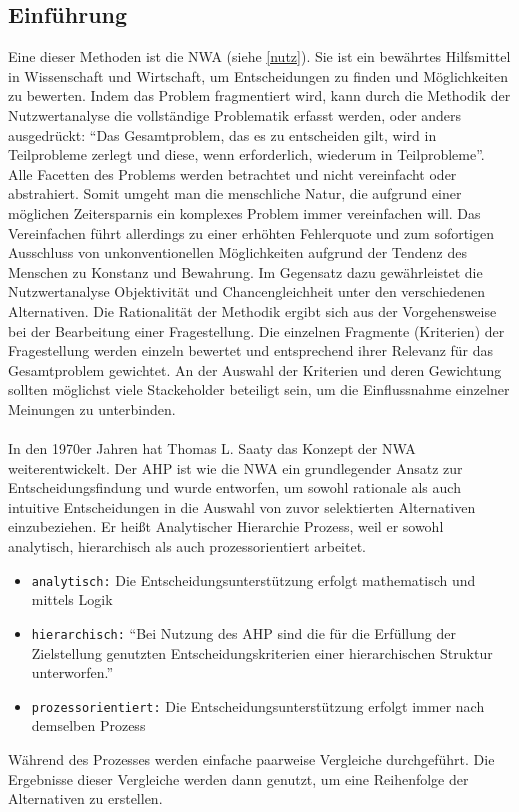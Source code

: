 \subsection{Einführung}
Eine dieser Methoden ist die \ac{NWA} (siehe \ref{nutz}). Sie ist ein bewährtes Hilfsmittel in Wissenschaft und Wirtschaft, um Entscheidungen zu finden und Möglichkeiten zu bewerten. Indem das Problem fragmentiert wird, kann durch die Methodik der Nutzwertanalyse die vollständige Problematik erfasst werden, oder anders ausgedrückt: \enquote{Das Gesamtproblem, das es zu entscheiden gilt, wird in Teilprobleme zerlegt und diese, wenn erforderlich, wiederum in Teilprobleme}\autocite[S.1]{Kuehnapfel.2014}. Alle Facetten des Problems werden betrachtet und nicht vereinfacht oder abstrahiert. Somit umgeht man die menschliche Natur, die aufgrund einer möglichen Zeitersparnis ein komplexes Problem immer vereinfachen will. Das Vereinfachen führt allerdings zu einer erhöhten Fehlerquote und zum sofortigen Ausschluss von unkonventionellen Möglichkeiten aufgrund der Tendenz des Menschen zu Konstanz und Bewahrung\autocite[Vgl.][S.1]{Kuehnapfel.2014}. Im Gegensatz dazu gewährleistet die Nutzwertanalyse Objektivität und Chancengleichheit unter den verschiedenen Alternativen.\newline
Die Rationalität der Methodik ergibt sich aus der Vorgehensweise bei der Bearbeitung einer Fragestellung. Die einzelnen Fragmente (Kriterien) der Fragestellung werden einzeln bewertet und entsprechend ihrer Relevanz für das Gesamtproblem gewichtet.\autocite[Vgl.][S.10]{Kuehnapfel.2014} An der Auswahl der Kriterien und deren Gewichtung sollten möglichst viele Stackeholder beteiligt sein, um die Einflussnahme einzelner Meinungen zu unterbinden.\\
\\
In den 1970er Jahren hat Thomas L. Saaty das Konzept der \ac{NWA} weiterentwickelt. Der \ac{AHP} ist wie die \ac{NWA} ein grundlegender Ansatz zur Entscheidungsfindung und wurde entworfen, um sowohl rationale als auch intuitive Entscheidungen in die Auswahl von zuvor selektierten Alternativen einzubeziehen.\autocite[Vgl.][S.1]{Saaty.2012} Er heißt Analytischer Hierarchie Prozess, weil er sowohl analytisch, hierarchisch als auch prozessorientiert arbeitet.\autocite[Vgl.][]{TUM.2015}
\begin{itemize}
	\item\texttt{analytisch:} Die Entscheidungsunterstützung erfolgt mathematisch und mittels Logik
	\item\texttt{hierarchisch:} \enquote{Bei Nutzung des AHP sind die für die Erfüllung der Zielstellung genutzten Entscheidungskriterien einer hierarchischen Struktur unterworfen.}\autocite[S.314]{Hausladen.2016} 
	\item\texttt{prozessorientiert:} Die Entscheidungsunterstützung erfolgt immer nach demselben Prozess
\end{itemize}
Während des Prozesses werden einfache paarweise Vergleiche durchgeführt. Die Ergebnisse dieser Vergleiche werden dann genutzt, um eine Reihenfolge der Alternativen zu erstellen.\autocite[Vgl.][S.1]{Saaty.2012}
